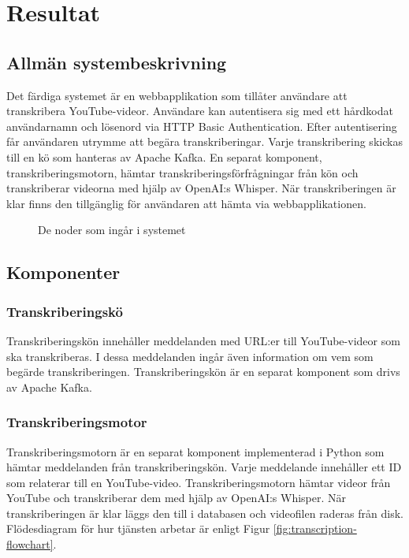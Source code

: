 \chapter{Resultat}

\section{Allmän systembeskrivning}
Det färdiga systemet är en webbapplikation som tillåter användare att
transkribera YouTube-videor. Användare kan autentisera sig med ett hårdkodat
användarnamn och lösenord via HTTP Basic Authentication. Efter autentisering
får användaren utrymme att begära transkriberingar. Varje transkribering 
skickas till en kö som hanteras av Apache Kafka. En separat komponent, 
transkriberingsmotorn, hämtar transkriberingsförfrågningar från kön och
transkriberar videorna med hjälp av OpenAI:s Whisper. När transkriberingen är
klar finns den tillgänglig för användaren att hämta via webbapplikationen.

\begin{figure}[h]
    \centering
    
    \caption{De noder som ingår i systemet}
    \label{fig:system-nodes}
\end{figure}

\section{Komponenter}

\subsection{Transkriberingskö}
Transkriberingskön innehåller meddelanden med URL:er till YouTube-videor som
ska transkriberas. I dessa meddelanden ingår även information om vem som
begärde transkriberingen. Transkriberingskön är en separat komponent som drivs
av Apache Kafka.

\subsection{Transkriberingsmotor}
Transkriberingsmotorn är en separat komponent implementerad i Python som
hämtar meddelanden från transkriberingskön. Varje meddelande innehåller ett
ID som relaterar till en YouTube-video. Transkriberingsmotorn hämtar videor
från YouTube och transkriberar dem med hjälp av OpenAI:s Whisper. När
transkriberingen är klar läggs den till i databasen och videofilen raderas
från disk. Flödesdiagram för hur tjänsten arbetar är enligt Figur
\ref{fig:transcription-flowchart}. 

